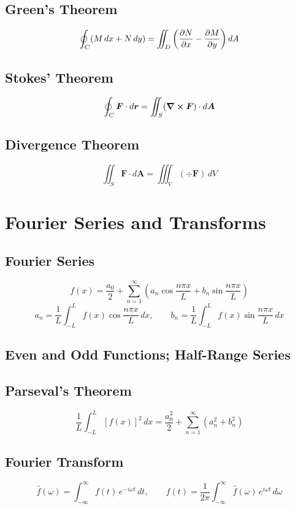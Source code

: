 \documentclass[11pt, letterpaper]{article}
\theoremstyle{plain}
\newcommand{\vv}[1]{\bm{#1}}
\begin{document}
\subsection{Green's Theorem}
\[
  \oint_C (M\,dx + N\,dy) = \iint_D \left(\pdv{N}{x}-\pdv{M}{y}\right)dA
\]

\subsection{Stokes' Theorem}
\[
  \oint_C \vv{F}\cdot d\vv{r} = \iint_S (\curl\vv{F})\cdot d\vv{A}
\]

\subsection{Divergence Theorem}
\[
  \iint_S \vv{F}\cdot d\vv{A} = \iiint_V (\div\vv{F})\,dV
\]


\section{Fourier Series and Transforms}   %

\subsection{Fourier Series}
\[
  f(x) = \frac{a_0}{2} + \sum_{n=1}^\infty \left(a_n\cos\frac{n\pi x}{L}
         + b_n\sin\frac{n\pi x}{L}\right)
\]
\[
  a_n = \frac{1}{L}\int_{-L}^{L} f(x)\cos\frac{n\pi x}{L}\,dx, \qquad
  b_n = \frac{1}{L}\int_{-L}^{L} f(x)\sin\frac{n\pi x}{L}\,dx
\]

\subsection{Even and Odd Functions; Half-Range Series}

\subsection{Parseval's Theorem}
\[
  \frac{1}{L}\int_{-L}^{L}[f(x)]^2\,dx
  = \frac{a_0^2}{2} + \sum_{n=1}^\infty(a_n^2 + b_n^2)
\]

\subsection{Fourier Transform}
\[
  \hat{f}(\omega) = \int_{-\infty}^\infty f(t)\,e^{-i\omega t}\,dt, \qquad
  f(t) = \frac{1}{2\pi}\int_{-\infty}^\infty \hat{f}(\omega)\,e^{i\omega t}\,d\omega
\]
\end{document}
